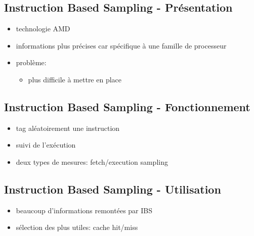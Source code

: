 \documentclass[mathserif]{beamer}
\newcommand{\bframe}{\begin{frame}{\secname}{\subsecname}}
\begin{document}
    \subsection{Instruction Based Sampling - Présentation}
      \bframe
        \begin{itemize}
          \item technologie AMD
          \item informations plus précises car spécifique à une famille de
            processeur
          \item problème:
            \begin{itemize}
              \item plus difficile à mettre en place
            \end{itemize} 
        \end{itemize}
      \end{frame}

    \subsection{Instruction Based Sampling - Fonctionnement}
      \bframe
        \begin{itemize}
          \item tag aléatoirement une instruction
          \item suivi de l'exécution
          \item deux types de mesures: fetch/execution sampling
        \end{itemize}
      \end{frame}

    \subsection{Instruction Based Sampling - Utilisation}
      \bframe
        \begin{itemize}
          \item<1-2> beaucoup d'informations remontées par IBS
          \item<1-2> sélection des plus utiles: cache hit/miss
        \end{itemize}

      \end{frame}
\end{document}
